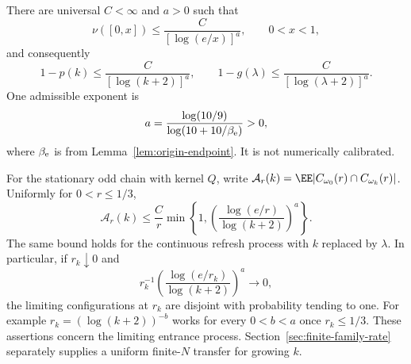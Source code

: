 \documentclass[11pt,letterpaper]{article}
\begin{document}
\begin{theorem}
\label{thm:logarithmic-spectrum}
There are universal $C<\infty$ and $a>0$ such that
\begin{equation}\label{eq:log-spectral-tail}
 \nu([0,x])\le \frac{C}{[\log(e/x)]^a},\qquad 0<x<1,
\end{equation}
and consequently
\begin{equation}\label{eq:log-noise-decay}
 1-p(k)\le\frac{C}{[\log(k+2)]^a},\qquad
 1-g(\lambda)\le\frac{C}{[\log(\lambda+2)]^a}.
\end{equation}
One admissible exponent is
\[
 a=\frac{\log(10/9)}{\log(10+10/\beta_{\rm e})}>0,
\]
where $\beta_{\rm e}$ is from Lemma~\ref{lem:origin-endpoint}.
It is not numerically calibrated.

For the stationary odd chain with kernel $Q$, write
$\mathcal A_r(k)=\EE|C_{\omega_0}(r)\cap C_{\omega_k}(r)|$.
Uniformly for $0<r\le1/3$,
\begin{equation}\label{eq:shrinking-cutoff-overlap}
 \mathcal A_r(k)\le\frac C r
 \min\left\{1,
       \left(\frac{\log(e/r)}{\log(k+2)}\right)^a\right\}.
\end{equation}
The same bound holds for the continuous refresh process with $k$
replaced by $\lambda$. In particular, if $r_k\downarrow0$ and
\[
 r_k^{-1}\left(\frac{\log(e/r_k)}{\log(k+2)}\right)^a\longrightarrow0,
\]
the limiting configurations at $r_k$ are disjoint with probability
tending to one. For example $r_k=(\log(k+2))^{-b}$ works for every
$0<b<a$ once $r_k\le1/3$.
These assertions concern the limiting entrance process.
Section~\ref{sec:finite-family-rate} separately supplies a uniform
finite-$N$ transfer for growing $k$.
\end{theorem}
\end{document}
